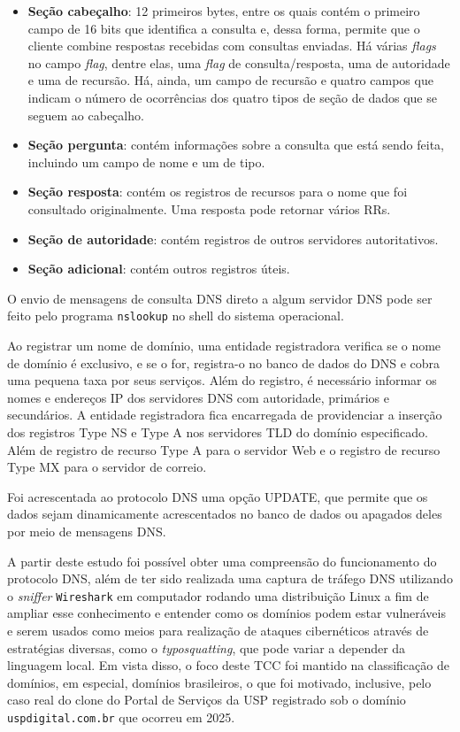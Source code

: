 \begin{itemize}
    \item \textbf{Seção cabeçalho}: 12 primeiros bytes, entre os quais contém o primeiro campo de 16 bits que identifica a consulta e, dessa forma, permite que o cliente combine respostas recebidas com consultas enviadas. Há várias \textit{flags} no campo \textit{flag}, dentre elas, uma \textit{flag} de consulta/resposta, uma de autoridade e uma de recursão. Há, ainda, um campo de recursão e quatro campos que indicam o número de ocorrências dos quatro tipos de seção de dados que se seguem ao cabeçalho.
    \item \textbf{Seção pergunta}: contém informações sobre a consulta que está sendo feita, incluindo um campo de nome e um de tipo.
    \item \textbf{Seção resposta}: contém os registros de recursos para o nome que foi consultado originalmente. Uma resposta pode retornar vários RRs.
    \item \textbf{Seção de autoridade}: contém registros de outros servidores autoritativos.
    \item \textbf{Seção adicional}: contém outros registros úteis.
\end{itemize}

O envio de mensagens de consulta DNS direto a algum servidor DNS pode ser feito pelo programa \texttt{nslookup} no shell do sistema operacional.

Ao registrar um nome de domínio, uma entidade registradora verifica se o nome de domínio é exclusivo, e se o for, registra-o no banco de dados do DNS e cobra uma pequena taxa por seus serviços. Além do registro, é necessário informar os nomes e endereços IP dos servidores DNS com autoridade, primários e secundários. A entidade registradora fica encarregada de providenciar a inserção dos registros Type NS e Type A nos servidores TLD do domínio especificado. Além de registro de recurso Type A para o servidor Web e o registro de recurso Type MX para o servidor de correio.

Foi acrescentada ao protocolo DNS uma opção UPDATE, que permite que os dados sejam dinamicamente acrescentados no banco de dados ou apagados deles por meio de mensagens DNS.

A partir deste estudo foi possível obter uma compreensão do funcionamento do protocolo DNS, além de ter sido realizada uma captura de tráfego DNS utilizando o \textit{sniffer} \texttt{Wireshark} em computador rodando uma distribuição Linux a fim de ampliar esse conhecimento e entender como os domínios podem estar vulneráveis e serem usados como meios para realização de ataques cibernéticos através de estratégias diversas, como o \textit{typosquatting}, que pode variar a depender da linguagem local. Em vista disso, o foco deste TCC foi mantido na classificação de domínios, em especial, domínios brasileiros, o que foi motivado, inclusive, pelo caso real do clone do Portal de Serviços da USP registrado sob o domínio \texttt{uspdigital.com.br} que ocorreu em 2025.

